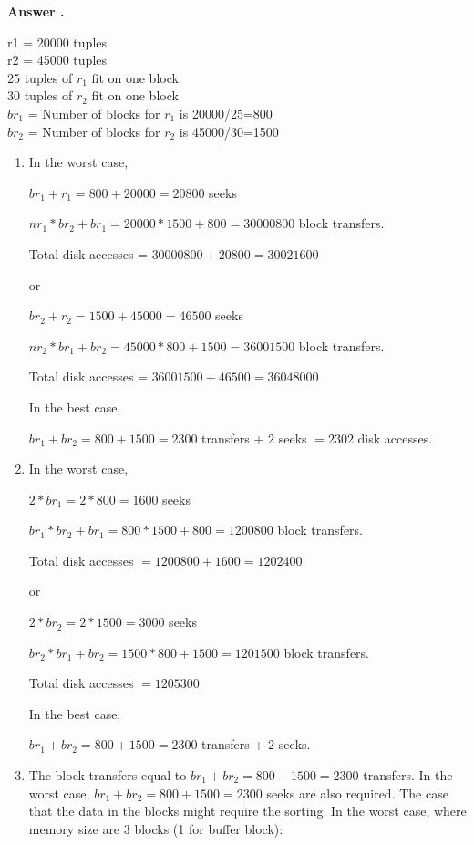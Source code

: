 \documentclass[paper=8.27in:11.69in, 14pt, DIV=calc]{scrartcl}
\newcounter{answers}
\newcommand\printanswers{\refstepcounter{answers}\theanswers}
\begin{document}
\textbf{Answer \printanswers .\\}

\noindent r1 = 20000 tuples\\
r2 = 45000 tuples\\
25 tuples of $r_{1}$ fit on one block\\
30 tuples of $r_{2}$ fit on one block\\

\noindent$b{r_{1}}$ = Number of blocks for $r_{1}$ is 20000/25=800\\
$b{r_{2}}$ = Number of blocks for $r_{2}$ is 45000/30=1500

\begin{enumerate}[label=\alph*.]

\item In the worst case,

$b{r_{1}} + r_{1} = 800 + 20000 = 20800$ seeks

$n{r_{1}} * b{r_{2}} + b{r_{1}} = 20000 * 1500 + 800 = 30000800$ block transfers.

Total disk accesses = $30000800 + 20800 = 30021600$

or

$b{r_{2}} + r_{2} = 1500 + 45000 = 46500$ seeks

$n{r_{2}} * b{r_{1}} + b{r_{2}} = 45000 * 800 + 1500 = 36001500$‬ block transfers.

Total disk accesses = $36001500‬ + 46500 = 36048000$

In the best case,

$b{r_{1}} + b{r_{2}} = 800 + 1500 = 2300$ transfers + $2$ seeks $= 2302$ disk accesses.


\item In the worst case,

$2*b{r_{1}} = 2*800 = 1600$ seeks

$b{r_{1}} * b{r_{2}} + b{r_{1}} = 800 * 1500 + 800 = 1200800$‬ block transfers.

Total disk accesses $= 1200800‬ + 1600 = 1202400‬$

or

$2*b{r_{2}} = 2*1500 = 3000$ seeks

$b{r_{2}} * b{r_{1}} + b{r_{2}} = 1500 * 800 + 1500 = 1201500$ block transfers.

Total disk accesses $= 1205300$

In the best case,

$b{r_{1}} + b{r_{2}} = 800 + 1500 = 2300$ transfers + $2$ seeks.

\item The block transfers equal to $b{r_{1}} + b{r_{2}} = 800 + 1500 = 2300$ transfers. In the worst case, $b{r_{1}} + b{r_{2}} = 800 + 1500 = 2300$ seeks are also required. The case that the data in the blocks might require the sorting. In the worst case, where memory size are 3 blocks (1 for buffer block):


\end{enumerate}
\end{document}
